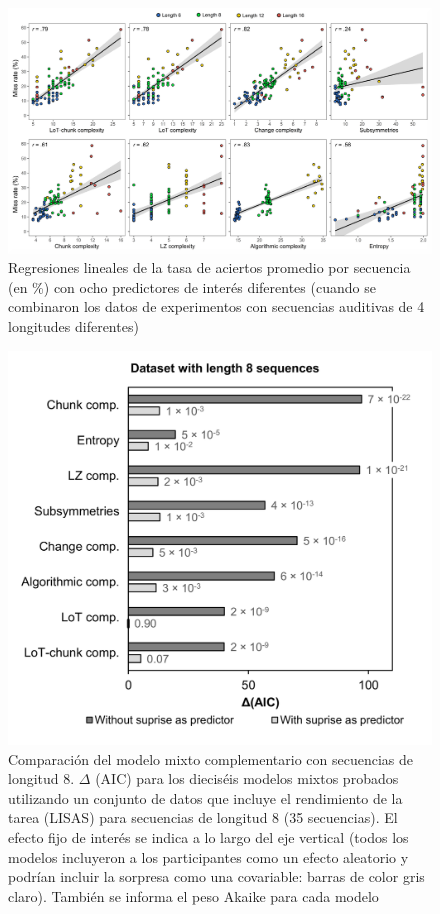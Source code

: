 \begin{figure}[t!]
      \includegraphics[scale=0.8]{figuras/plosbio/journal.pcbi.1008598.s010.png}
      \centering
      \caption{Regresiones lineales de la tasa de aciertos promedio por secuencia (en \%) con ocho predictores de interés diferentes (cuando se combinaron los datos de experimentos con secuencias auditivas de 4 longitudes diferentes)}
      \label{PlosBIO-S10}
\end{figure}

\begin{figure}[t!]
      \includegraphics[scale=0.8]{figuras/plosbio/journal.pcbi.1008598.s011.png}
      \centering
      \caption{Comparación del modelo mixto complementario con secuencias de longitud 8. $\Delta$ (AIC) para los dieciséis modelos mixtos probados utilizando un conjunto de datos que incluye el rendimiento de la tarea (LISAS) para secuencias de longitud 8 (35 secuencias). El efecto fijo de interés se indica a lo largo del eje vertical (todos los modelos incluyeron a los participantes como un efecto aleatorio y podrían incluir la sorpresa como una covariable: barras de color gris claro). También se informa el peso Akaike para cada modelo}
      \label{PlosBIO-S11}
\end{figure}